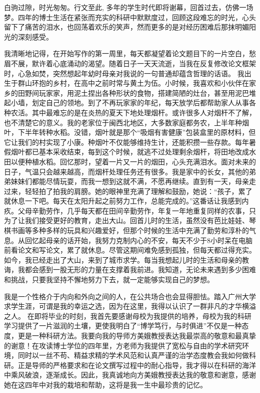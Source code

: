 \begin{thanks}

白驹过隙，时光匆匆。行文至此, 多年的学生时代即将谢幕，回首过去，仿佛一场梦。四年的博士生活在紧张而充实的科研中默默度过，回顾这段难忘的时光，心头留下了痛苦的泪水，也回荡着欢乐的笑声，然而更多的是对经历困难后那抹明媚阳光的深刻感受。

我清晰地记得，在开始写作的第一周里，每天都凝望着论文题目下的一片空白，愁眉不展，默许着心底涌动的渴望。随着日子一天天流逝，当我在反复修改论文框架时，心急如焚，突然想起年幼时母亲对我说的一句普通却蕴含哲理的话语。
我出生于群山环抱的乡村，在高中之前时常与黄土为伍。小时候，我喜欢和小伙伴在家乡的田野间玩家家，用泥土捏出各种形状的食物，搭建简陋的灶台，甚至用泥巴堆起小墙，划定自己的领地。到了不再玩家家的年纪，每天放学后都帮助家人从事各种农活。其中最难忘的是在炎热的夏天下地处理烟杆。或许很多人对烟杆不了解，也不清楚它的意义。我的老家位于闽西北地区，大多数家庭都务农，上半年种烟叶，下半年转种水稻。没错，烟叶就是那个“吸烟有害健康”包装盒里的原材料，但它让我们的村实现了小康。种烟叶不仅能够维持生计，还能积攒一些存款。每年暑假烟叶都已基本采收结束，每到这个时候，就逃不过处理剩余烟杆，将田地改成水田以便种植水稻。回忆那时，望着一片又一片的烟田，心头充满泪水。面对未来的日子，气温只会越来越高，而烟杆处理任务还有很多。我是家中的长女，其他的弟弟妹妹们都能尽情玩耍，而我一想到这就不满，不愿再继续。直到有一天，母亲走过来，轻轻拍了拍我的肩膀。她的眼神里充满了理解和鼓励，她说：“孩子，累了就休息一下吧。每天在太阳升起之前努力工作，总能完成的。”这番话让我感到内疚。父母辛勤劳作，几乎每天都在田间辛勤劳作，年复一年地重复同样的农事，只为了让我们接受更好的教育，走出大山。回首儿时的生活，虽然没有芭比娃娃、琴棋书画等多种多样的玩具和兴趣爱好，但那个时候的生活中充满了勤劳和淳朴的气息。从回忆起母亲的话开始，我努力克制内心的不安，每天不少于8小时呆在电脑前看论文和写论文，累了就休息。尽管这期间难免感到孤独，但每天都过得充实。如今，我已经走出了大山，来到了城市求学。每当我想起儿时的生活和母亲的教诲，我都会感到一股无形的力量在支撑着我前进。我知道，无论未来遇到多少困难和挑战，只要我坚持不懈地努力下去，就一定能够实现自己的梦想。

我是一个性格介于内向和外向之间的人，在公共场合也会显得胆怯。踏入广州大学求学生涯，可谓是我的幸运之选，因为在这里，我得以认识了一群非凡的才华横溢之人。
在即将毕业的时刻，我首先要感谢母校为我提供的培养，母校为我的科研学习提供了一片滋润的土壤，更使我明白了“博学笃行，与时俱进”不仅是一种态度，更是一种科研方法。我要向我的导师方美娥教授表达我最崇高的敬意和最真挚的谢意！在攻读博士学位的四年里，方老师为我提供了宽松与自由的学术研究环境，同时以一丝不苟、精益求精的学术风范和认真严谨的治学态度教会我如何做科研。正是导师的严格要求和在论文撰写过程中的耐心指导，我才得以在科研的海洋中乘风破浪，逐渐成长。因此，我真诚地向方美娥教授表达我的敬意和谢意，感谢她在这四年中对我的栽培和帮助，这将是我一生中最珍贵的记忆。


\end{thanks}
